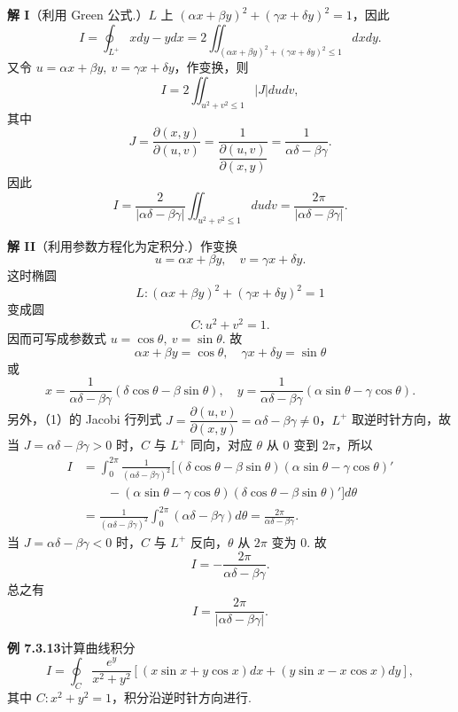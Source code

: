 \documentclass[UTF8, 12pt, fontset=fandol, oneside]{ctexart}
\begin{document}
\noindent\textbf{解 I}\quad （利用 Green 公式.）$L$ 上 $(\alpha x+\beta y)^2+(\gamma x+\delta y)^2=1$，因此
\[
I=\oint_{L^+}xdy-ydx
=2\iint_{(\alpha x+\beta y)^2+(\gamma x+\delta y)^2\le1}dxdy.
\]
又令 $u=\alpha x+\beta y,\ v=\gamma x+\delta y$，作变换，则
\[
I=2\iint_{u^2+v^2\le1}|J|dudv,
\]
其中
\[
J=\frac{\partial(x,y)}{\partial(u,v)}
=\frac1{\dfrac{\partial(u,v)}{\partial(x,y)}}
=\frac1{\alpha\delta-\beta\gamma}.
\]
因此
\[
I=\frac2{|\alpha\delta-\beta\gamma|}
\iint_{u^2+v^2\le1}dudv
=\frac{2\pi}{|\alpha\delta-\beta\gamma|}.
\]

\noindent\textbf{解 II}\quad （利用参数方程化为定积分.）作变换
\[
u=\alpha x+\beta y,\quad v=\gamma x+\delta y. \tag{1}
\]
这时椭圆
\[
L:(\alpha x+\beta y)^2+(\gamma x+\delta y)^2=1
\]
变成圆
\[
C:u^2+v^2=1.
\]
因而可写成参数式 $u=\cos\theta,\ v=\sin\theta$. 故
\[
\alpha x+\beta y=\cos\theta,\quad \gamma x+\delta y=\sin\theta
\]
或
\[
x=\frac1{\alpha\delta-\beta\gamma}(\delta\cos\theta-\beta\sin\theta),\quad
y=\frac1{\alpha\delta-\beta\gamma}(\alpha\sin\theta-\gamma\cos\theta).
\]
另外，（1）的 Jacobi 行列式 $J=\dfrac{\partial(u,v)}{\partial(x,y)}
=\alpha\delta-\beta\gamma\ne0$，$L^+$ 取逆时针方向，故当 $J=\alpha\delta-\beta\gamma>0$ 时，$C$ 与 $L^+$ 同向，对应 $\theta$ 从 $0$ 变到 $2\pi$，所以
\[
\begin{aligned}
I&=\int_0^{2\pi}\frac1{(\alpha\delta-\beta\gamma)^2}
\bigl[(\delta\cos\theta-\beta\sin\theta)(\alpha\sin\theta-\gamma\cos\theta)'\\
&\qquad
-(\alpha\sin\theta-\gamma\cos\theta)(\delta\cos\theta-\beta\sin\theta)'\bigr]d\theta\\
&=\frac1{(\alpha\delta-\beta\gamma)^2}
\int_0^{2\pi}(\alpha\delta-\beta\gamma)d\theta
=\frac{2\pi}{\alpha\delta-\beta\gamma}.
\end{aligned}
\]
当 $J=\alpha\delta-\beta\gamma<0$ 时，$C$ 与 $L^+$ 反向，$\theta$ 从 $2\pi$ 变为 $0$. 故
\[
I=-\frac{2\pi}{\alpha\delta-\beta\gamma}.
\]
总之有
\[
I=\frac{2\pi}{|\alpha\delta-\beta\gamma|}.
\]

\noindent\textbf{例 7.3.13}\quad 计算曲线积分
\[
I=\oint_C\frac{e^y}{x^2+y^2}
[(x\sin x+y\cos x)dx+(y\sin x-x\cos x)dy],
\]
其中 $C:x^2+y^2=1$，积分沿逆时针方向进行.
\end{document}
